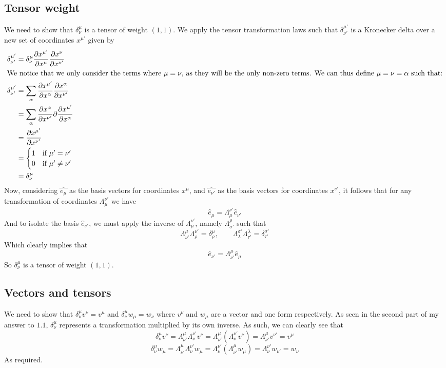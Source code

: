 \documentclass{article}
\begin{document}
		\subsection{Tensor weight}
			We need to show that $\delta_\nu^\mu$ is a tensor of weight $(1,1)$. We apply the tensor transformation laws such that $\delta_{\nu'}^{\mu '}$ is a Kronecker delta over a new set of coordinates $x^{\mu'}$ given by
			\begin{align*}
				\delta_{\nu'}^{\mu '} &= \delta_{\nu}^\mu \frac{\partial x^{\mu'}}{\partial x^\mu} \frac{\partial x^\nu}{\partial x^{\nu '}} \\
			\intertext{We notice that we only consider the terms where $\mu = \nu$, as they will be the only non-zero terms. We can thus define $\mu=\nu=\alpha$ such that:}
				\delta_{\nu'}^{\mu '} &= \sum_\alpha \frac{\partial x^{\mu'}}{\partial x^\alpha} \frac{\partial x^\alpha}{\partial x^{\nu '}} \\
				&= \sum_\alpha \frac{\partial x^\alpha}{\partial x^{\nu '}} \partial \frac{\partial x^{\mu '}}{\partial x^\alpha} \\
				&= \frac{\partial x^{\mu '}}{\partial x^{\nu'}} \\
				&= 
					\begin{cases}
						1 & \text{if } \mu' = \nu' \\
						0 & \text{if } \mu' \neq \nu' 
					\end{cases} \\
				&= \delta_{\nu}^\mu
			\end{align*}
			Now, considering $\hat{e_\mu}$ as the basis vectors for coordinates $x^\mu$, and $\hat{e_{\nu'}}$ as the basis vectors for coordinates $x^{\nu'}$, it follows that for any transformation of coordinates $\Lambda^{\nu'}_{\mu}$ we have
			$$ \hat{e}_\mu = \Lambda_\mu^{\nu'} \hat{e}_{\nu'}$$
			And to isolate the basis $\hat{e}_{\nu'}$, we must apply the inverse of $\Lambda_{\mu}^{\nu'}$, namely $\Lambda_{\sigma'}^\rho$ such that
			$$ \Lambda_{\nu'}^{\mu}\Lambda_{\rho}^{\nu'} = \delta_\rho^\mu, \quad \quad \Lambda_{\lambda}^{\sigma'} \Lambda_{\tau'}^{\lambda} = \delta_{\tau'}^{\sigma'}$$
			Which clearly implies that
			$$ \hat{e}_{\nu'} = \Lambda^\mu_{\nu'} \hat{e}_\mu$$
			So $\delta_{\nu}^\mu$ is a tensor of weight $(1,1)$.
		\subsection{Vectors and tensors}
			We need to show that $\delta_\nu^\mu v^\nu = v^\mu$ and $\delta_{\nu}^{\mu} w_\mu = w_\nu$ where $v^\nu$ and $w_\mu$ are a vector and one form respectively. As seen in the second part of my answer to $1.1$, $\delta_{\nu}^\mu$ represents a transformation multiplied by its own inverse. As such, we can clearly see that
			$$ \delta_\nu^\mu v^\nu = \Lambda_{\nu'}^\mu \Lambda_{\nu}^{\nu'} v^\nu = \Lambda_{\nu'}^{\mu} ( \Lambda_{\nu}^{\nu'}  v^\nu) = \Lambda_{\nu'}^{\mu} v^{\nu'} = v^\mu$$
			$$ \delta_\nu^\mu w_\mu = \Lambda_{\nu'}^\mu \Lambda_{\nu}^{\nu'} w_\mu = \Lambda_{\nu}^{\nu'}(\Lambda_{\nu'}^{\mu}w_\mu)  = \Lambda_{\nu}^{\nu'} w_{\nu'} = w_\nu  $$
			As required.
\end{document}
